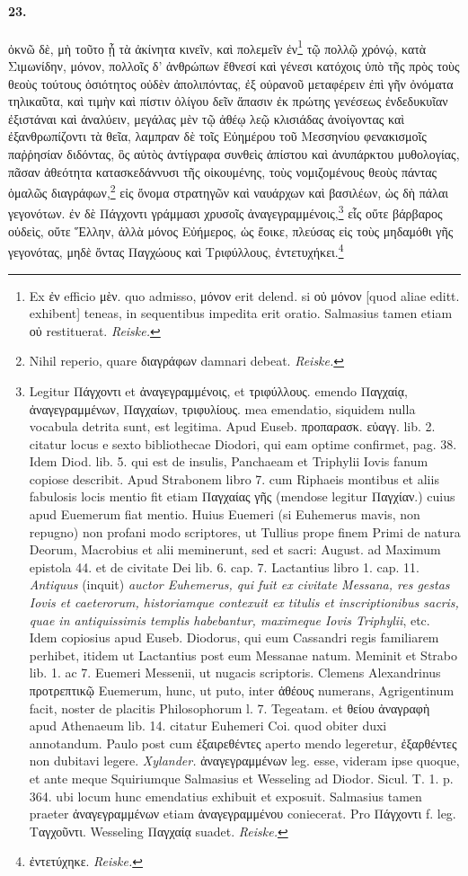 \documentclass[a4paper, 11pt, oneside, polutonikogreek, german, landscape]{article}
\begin{document}
\paragraph{23.}
ὀκνῶ δὲ, μὴ τοῦτο ᾖ τὰ ἀκίνητα κινεῖν, καὶ πολεμεῖν ἐν\footnote{Ex ἐν efficio μὲν. quo admisso, μόνον erit delend. si οὐ μόνον [quod aliae editt. exhibent] teneas, in sequentibus impedita erit oratio. Salmasius tamen etiam οὐ restituerat. \emph{Reiske.}} τῷ πολλῷ χρόνῴ, κατὰ Σιμωνίδην, μόνον, πολλοῖς δ' ἀνθρώπων ἔθνεσί καὶ γένεσι κατόχοις ὑπὸ τῆς πρὸς τοὺς θεοὺς τούτους ὁσιότητος οὐδὲν ἀπολιπόντας, ἐξ οὐρανοῦ μεταφέρειν ἐπὶ γῆν ὀνόματα τηλικαῦτα, καὶ τιμὴν καὶ πίστιν ὀλίγου δεῖν ἅπασιν ἐκ πρώτης γενέσεως ἐνδεδυκυῖαν ἐξιστάναι καὶ ἀναλύειν, μεγάλας μὲν τῷ ἀθέῳ λεῷ κλισιάδας ἀνοίγοντας καὶ ἐξανθρωπίζοντι τὰ θεῖα, λαμπραν δὲ τοῖς Εὐημέρου τοῦ Μεσσηνίου φενακισμοῖς παῤῥησίαν διδόντας, ὃς αὐτὸς ἀντίγραφα συνθεὶς ἀπίστου καὶ ἀνυπάρκτου μυθολογίας, πᾶσαν ἀθεότητα κατασκεδάννυσι τῆς οἰκουμένης, τοὺς νομιζομένους θεοὺς πάντας ὁμαλῶς διαγράφων,\footnote{Nihil reperio, quare διαγράφων damnari debeat. \emph{Reiske.}} εἰς ὄνομα στρατηγῶν καὶ ναυάρχων καὶ βασιλέων, ὡς δὴ πάλαι γεγονότων. ἐν δὲ Πάγχοντι γράμμασι χρυσοῖς ἀναγεγραμμένοις,\footnote{Legitur Πάγχοντι et ἀναγεγραμμένοις, et τριφύλλους. emendo Παγχαίᾳ, ἀναγεγραμμένων, Παγχαίων, τριφυλίους. mea emendatio, siquidem nulla vocabula detrita sunt, est legitima. Apud Euseb. προπαρασκ. εὐαγγ. lib. 2. citatur locus e sexto bibliothecae Diodori, qui eam optime confirmet, pag. 38. Idem Diod. lib. 5. qui est de insulis, Panchaeam et Triphylii Iovis fanum copiose describit. Apud Strabonem libro 7. cum Riphaeis montibus et aliis fabulosis locis mentio fit etiam Παγχαίας γῆς (mendose legitur Παγχίαν.) cuius apud Euemerum fiat mentio. Huius Euemeri (si Euhemerus mavis, non repugno) non profani modo scriptores, ut Tullius prope finem Primi de natura Deorum, Macrobius et alii meminerunt, sed et sacri: August. ad Maximum epistola 44. et de civitate Dei lib. 6. cap. 7. Lactantius libro 1. cap. 11. \emph{Antiquus} (inquit) \emph{auctor Euhemerus, qui fuit ex civitate Messana, res gestas Iovis et caeterorum, historiamque contexuit ex titulis et inscriptionibus sacris, quae in antiquissimis templis habebantur, maximeque Iovis Triphylii}, etc. Idem copiosius apud Euseb. Diodorus, qui eum Cassandri regis familiarem perhibet, itidem ut Lactantius post eum Messanae natum. Meminit et Strabo lib. 1. ac 7. Euemeri Messenii, ut nugacis scriptoris. Clemens Alexandrinus προτρεπτικῷ Euemerum, hunc, ut puto, inter ἀθέους numerans, Agrigentinum facit, noster de placitis Philosophorum l. 7. Tegeatam. et θείου ἀναγραφὴ apud Athenaeum lib. 14. citatur Euhemeri Coi. quod obiter duxi annotandum. Paulo post cum ἐξαιρεθέντες aperto mendo legeretur, ἐξαρθέντες non dubitavi legere. \emph{Xylander.} ἀναγεγραμμένων leg. esse, videram ipse quoque, et ante meque Squiriumque Salmasius et Wesseling ad Diodor. Sicul. T. 1. p. 364. ubi locum hunc emendatius exhibuit et exposuit. Salmasius tamen praeter ἀναγεγραμμένων etiam ἀναγεγραμμένου coniecerat. Pro Πάγχοντι f. leg. Ταγχοῦντι. Wesseling Παγχαίᾳ suadet. \emph{Reiske.}} εἷς οὔτε βάρβαρος οὐδεὶς, οὔτε Ἕλλην, ἀλλὰ μόνος Εὐήμερος, ὡς ἔοικε, πλεύσας εἰς τοὺς μηδαμόθι γῆς γεγονότας, μηδὲ ὄντας Παγχώους καὶ Τριφύλλους, ἐντετυχήκει.\footnote{ἐντετύχηκε. \emph{Reiske.}}
\end{document}

